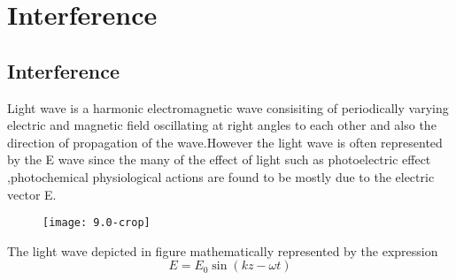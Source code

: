\chapter{Interference}
\section{Interference}
Light wave is a harmonic electromagnetic wave consisiting of periodically varying electric and magnetic field oscillating at right angles to each other and also the direction of propagation of the wave.However the light wave is often represented by the  E wave since the many of the effect of light such as photoelectric effect ,photochemical physiological actions are found to be mostly due to the electric vector E.\\
\begin{figure}[H]
	\centering
	\texttt{[image: 9.0-crop]}
	\caption{}
	\label{}
\end{figure}
The light wave depicted in figure mathematically represented by the expression\\
$$E=E_{0}\sin (kz-\omega t)$$
